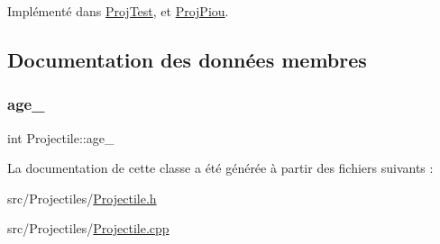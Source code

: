 Implémenté dans \hyperlink{class_proj_test_af0b751a8e8cb0b7d10857722b691f3b6}{Proj\+Test}, et \hyperlink{class_proj_piou_a964182d333ed2bf64408a7812bc4cd28}{Proj\+Piou}.



\subsection{Documentation des données membres}
\mbox{\label{class_projectile_a1f0a231e002d4796c32ccfeb36c887b1}} 
\subsubsection{\texorpdfstring{age\+\_\+}{age\_}}
{\footnotesize\ttfamily int Projectile\+::age\+\_\+\hspace{0.3cm}{\ttfamily [protected]}}



La documentation de cette classe a été générée à partir des fichiers suivants \+:\begin{DoxyCompactItemize}
\item 
src/\+Projectiles/\hyperlink{_projectile_8h}{Projectile.\+h}\item 
src/\+Projectiles/\hyperlink{_projectile_8cpp}{Projectile.\+cpp}\end{DoxyCompactItemize}
